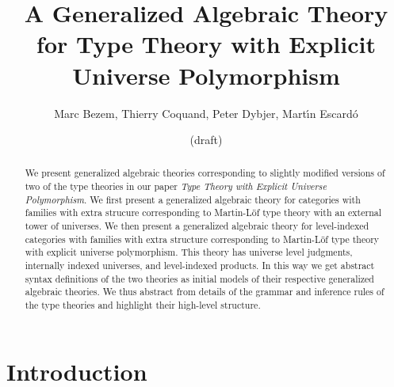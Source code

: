 \documentclass[11pt,a4paper]{article}
\theoremstyle{plain}
\theoremstyle{definition}
\begin{document}
\title{A Generalized Algebraic Theory\\ for Type Theory
with Explicit Universe Polymorphism
}

\author{Marc Bezem, Thierry Coquand, Peter Dybjer, Mart\'{\i}n Escard\'o}

\date{(draft)}
\maketitle

\begin{abstract}
We present generalized algebraic theories corresponding to slightly modified versions of two of the type theories in our paper
{\em Type Theory with Explicit Universe Polymorphism}. We first present a generalized algebraic theory for categories with families with extra strucure corresponding to Martin-Löf type theory with an external tower of universes. We then present a generalized algebraic theory for level-indexed categories with families with extra structure corresponding to Martin-Löf type theory with explicit universe polymorphism. This theory has universe level judgments, internally indexed universes, and level-indexed products. In this way we get abstract syntax definitions of the two theories as initial models of their respective generalized algebraic theories. We thus abstract from details of the grammar and inference rules of the type theories and highlight their high-level structure. 
\end{abstract}

\section{Introduction}
\end{document}
